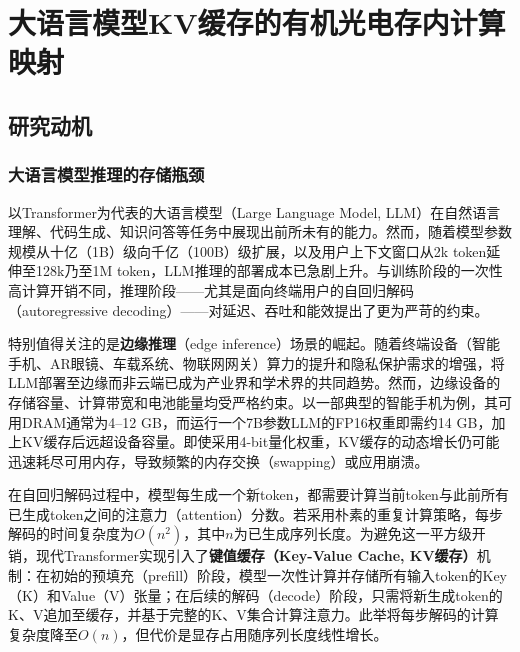 
\chapter{大语言模型KV缓存的有机光电存内计算映射}
\label{ch:work2_scope}

\section{研究动机}
\label{sec:work2_motivation}

\subsection{大语言模型推理的存储瓶颈}

以Transformer为代表的大语言模型（Large Language Model, LLM）在自然语言理解、代码生成、知识问答等任务中展现出前所未有的能力。然而，随着模型参数规模从十亿（1B）级向千亿（100B）级扩展，以及用户上下文窗口从2k token延伸至128k乃至1M token，LLM推理的部署成本已急剧上升。与训练阶段的一次性高计算开销不同，推理阶段——尤其是面向终端用户的自回归解码（autoregressive decoding）——对延迟、吞吐和能效提出了更为严苛的约束。

特别值得关注的是\textbf{边缘推理}（edge inference）场景的崛起。随着终端设备（智能手机、AR眼镜、车载系统、物联网网关）算力的提升和隐私保护需求的增强，将LLM部署至边缘而非云端已成为产业界和学术界的共同趋势。然而，边缘设备的存储容量、计算带宽和电池能量均受严格约束。以一部典型的智能手机为例，其可用DRAM通常为4–12 GB，而运行一个7B参数LLM的FP16权重即需约14 GB，加上KV缓存后远超设备容量。即使采用4-bit量化权重，KV缓存的动态增长仍可能迅速耗尽可用内存，导致频繁的内存交换（swapping）或应用崩溃。

在自回归解码过程中，模型每生成一个新token，都需要计算当前token与此前所有已生成token之间的注意力（attention）分数。若采用朴素的重复计算策略，每步解码的时间复杂度为$O(n^2)$，其中$n$为已生成序列长度。为避免这一平方级开销，现代Transformer实现引入了\textbf{键值缓存（Key-Value Cache, KV缓存）}机制：在初始的预填充（prefill）阶段，模型一次性计算并存储所有输入token的Key（K）和Value（V）张量；在后续的解码（decode）阶段，只需将新生成token的K、V追加至缓存，并基于完整的K、V集合计算注意力。此举将每步解码的计算复杂度降至$O(n)$，但代价是显存占用随序列长度线性增长。

